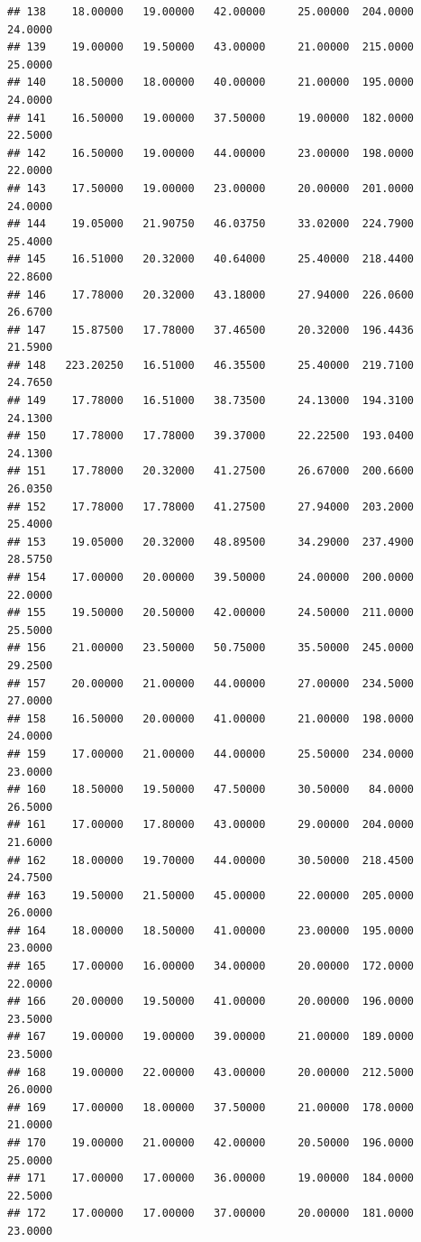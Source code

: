 \documentclass[]{article}
\begin{document}
\begin{verbatim}
## 138    18.00000   19.00000   42.00000     25.00000  204.0000     24.0000
## 139    19.00000   19.50000   43.00000     21.00000  215.0000     25.0000
## 140    18.50000   18.00000   40.00000     21.00000  195.0000     24.0000
## 141    16.50000   19.00000   37.50000     19.00000  182.0000     22.5000
## 142    16.50000   19.00000   44.00000     23.00000  198.0000     22.0000
## 143    17.50000   19.00000   23.00000     20.00000  201.0000     24.0000
## 144    19.05000   21.90750   46.03750     33.02000  224.7900     25.4000
## 145    16.51000   20.32000   40.64000     25.40000  218.4400     22.8600
## 146    17.78000   20.32000   43.18000     27.94000  226.0600     26.6700
## 147    15.87500   17.78000   37.46500     20.32000  196.4436     21.5900
## 148   223.20250   16.51000   46.35500     25.40000  219.7100     24.7650
## 149    17.78000   16.51000   38.73500     24.13000  194.3100     24.1300
## 150    17.78000   17.78000   39.37000     22.22500  193.0400     24.1300
## 151    17.78000   20.32000   41.27500     26.67000  200.6600     26.0350
## 152    17.78000   17.78000   41.27500     27.94000  203.2000     25.4000
## 153    19.05000   20.32000   48.89500     34.29000  237.4900     28.5750
## 154    17.00000   20.00000   39.50000     24.00000  200.0000     22.0000
## 155    19.50000   20.50000   42.00000     24.50000  211.0000     25.5000
## 156    21.00000   23.50000   50.75000     35.50000  245.0000     29.2500
## 157    20.00000   21.00000   44.00000     27.00000  234.5000     27.0000
## 158    16.50000   20.00000   41.00000     21.00000  198.0000     24.0000
## 159    17.00000   21.00000   44.00000     25.50000  234.0000     23.0000
## 160    18.50000   19.50000   47.50000     30.50000   84.0000     26.5000
## 161    17.00000   17.80000   43.00000     29.00000  204.0000     21.6000
## 162    18.00000   19.70000   44.00000     30.50000  218.4500     24.7500
## 163    19.50000   21.50000   45.00000     22.00000  205.0000     26.0000
## 164    18.00000   18.50000   41.00000     23.00000  195.0000     23.0000
## 165    17.00000   16.00000   34.00000     20.00000  172.0000     22.0000
## 166    20.00000   19.50000   41.00000     20.00000  196.0000     23.5000
## 167    19.00000   19.00000   39.00000     21.00000  189.0000     23.5000
## 168    19.00000   22.00000   43.00000     20.00000  212.5000     26.0000
## 169    17.00000   18.00000   37.50000     21.00000  178.0000     21.0000
## 170    19.00000   21.00000   42.00000     20.50000  196.0000     25.0000
## 171    17.00000   17.00000   36.00000     19.00000  184.0000     22.5000
## 172    17.00000   17.00000   37.00000     20.00000  181.0000     23.0000

\end{verbatim}
\end{document}
